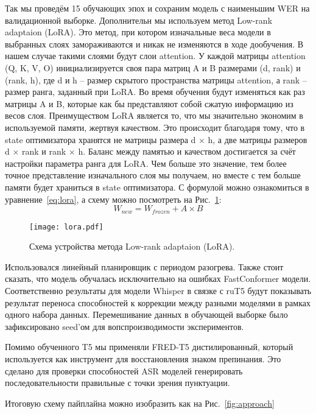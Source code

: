 Так мы проведём 15 обучающих эпох и сохраним модель с наименьшим WER на валидационной выборке.
Дополнительн мы используем метод Low-rank adaptaion (LoRA).
Это метод, при котором изначальные веса модели в выбранных слоях замораживаются и никак не изменяются в ходе дообучения.
В нашем случае такими слоями будут слои attention.
У каждой матрицы attention (Q, K, V, O) инициализируется своя пара матриц A и B размерами (d, rank) и (rank, h), где d и h – размер скрытого пространства матрицы attention, а rank – размер ранга, заданный при LoRA.
Во время обучения будут изменяться как раз матрицы A и B, которые как бы представляют собой сжатую информацию из весов слоя.
Преимуществом LoRA является то, что мы значительно экономим в используемой памяти, жертвуя качеством.
Это происходит благодаря тому, что в state оптимизатора хранятся не матрицы размера d $\times$ h, а две матрицы размеров d $\times$ rank и rank $\times$ h.
Баланс между памятью и качеством достигается за счёт настройки параметра ранга для LoRA.
Чем больше это значение, тем более точное представление изначального слоя мы получаем, но вместе с тем больше памяти будет храниться в state оптимизатора.
С формулой можно ознакомиться в уравнение~\ref{eq:lora}, а схему можно посмотреть на Рис.~\ref{fig:lora}:
\begin{equation}
  W_{new} = W_{frozen} + A \times B
  \label{eq:lora}
\end{equation}

\begin{figure}[!t]
  \centering
  \texttt{[image: lora.pdf]}
  \caption{Схема устройства метода Low-rank adaptaion (LoRA).}
  \label{fig:lora}
\end{figure}

Использовался линейный планировщик с периодом разогрева.
Также стоит сказать, что модель обучалась исключительно на ошибках FastConformer модели.
Соответственно результаты для модели Whisper в связке с ruT5 будут показывать результат переноса способностей к коррекции между разными моделями в рамках одного набора данных.
Перемешивание данных в обучающей выборке было зафиксировано seed'ом для вопспроизводимости экспериментов.

Помимо обученного T5 мы применяли FRED-T5 дистилированный, который используется как инструмент для восстановления знаком препинания.
Это сделано для проверки способностей ASR моделей генерировать последовательности правильные с точки зрения пунктуации.

Итоговую схему пайплайна можно изобразить как на Рис.~\ref{fig:approach}

